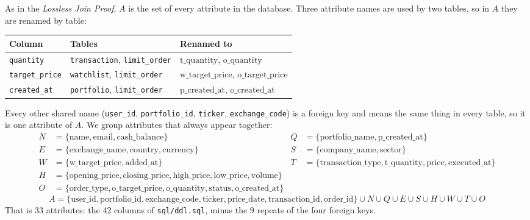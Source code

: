 \documentclass{article}
\newcommand{\at}[1]{\text{#1}}
\begin{document}
As in the \emph{Lossless Join Proof}, $A$ is the set of every attribute in the database. Three attribute names are used by two tables, so in $A$ they are renamed by table:
\begin{center}
\begin{tabular}{l l l}
  \toprule
  \textbf{Column} & \textbf{Tables} & \textbf{Renamed to} \\
  \midrule
  \texttt{quantity} & \texttt{transaction}, \texttt{limit\_order} & $\at{t\_quantity}$, $\at{o\_quantity}$ \\
  \texttt{target\_price} & \texttt{watchlist}, \texttt{limit\_order} & $\at{w\_target\_price}$, $\at{o\_target\_price}$ \\
  \texttt{created\_at} & \texttt{portfolio}, \texttt{limit\_order} & $\at{p\_created\_at}$, $\at{o\_created\_at}$ \\
  \bottomrule
\end{tabular}
\end{center}
Every other shared name (\texttt{user\_id}, \texttt{portfolio\_id}, \texttt{ticker}, \texttt{exchange\_code}) is a foreign key and means the same thing in every table, so it is one attribute of $A$. We group attributes that always appear together:
\begin{align*}
  N &= \{\at{name}, \at{email}, \at{cash\_balance}\} & Q &= \{\at{portfolio\_name}, \at{p\_created\_at}\} \\
  E &= \{\at{exchange\_name}, \at{country}, \at{currency}\} & S &= \{\at{company\_name}, \at{sector}\} \\
  W &= \{\at{w\_target\_price}, \at{added\_at}\} & T &= \{\at{transaction\_type}, \at{t\_quantity}, \at{price}, \at{executed\_at}\} \\
  H &= \{\at{opening\_price}, \at{closing\_price}, \at{high\_price}, \at{low\_price}, \at{volume}\} \\
  O &= \{\at{order\_type}, \at{o\_target\_price}, \at{o\_quantity}, \at{status}, \at{o\_created\_at}\}
\end{align*}
\[
  A = \{\at{user\_id}, \at{portfolio\_id}, \at{exchange\_code}, \at{ticker}, \at{price\_date}, \at{transaction\_id}, \at{order\_id}\} \cup N \cup Q \cup E \cup S \cup H \cup W \cup T \cup O
\]
That is 33 attributes: the 42 columns of \texttt{sql/ddl.sql}, minus the 9 repeats of the four foreign keys.
\end{document}
